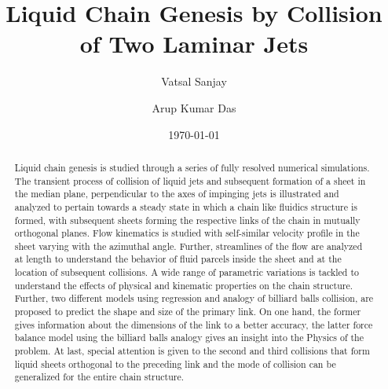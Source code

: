 \documentclass[%
aip,
sd,%
amsmath,amssymb,
preprint,%
author-year,%
]{revtex4-1}
\begin{document}
\newcommand{\MarkerCircleRed}{\raisebox{0.5pt}{\tikz{\node[draw,scale=0.4,circle,fill=red!100!red](){};}}}
\newcommand{\MarkerSquareRed}{\raisebox{0.5pt}{\tikz{\node[draw,scale=0.4,regular polygon, regular polygon sides=4,fill=black!20!red](){};}}}
\newcommand{\MarkerDiamondBlack}{\raisebox{0pt}{\tikz{\node[draw,scale=0.4,diamond,fill=black!100!](){};}}}


\title{Liquid Chain Genesis by Collision of Two Laminar Jets}
\author{Vatsal Sanjay}
\author{Arup Kumar Das}
\date{\today}

\begin{abstract}
Liquid chain genesis is studied through a series of fully resolved numerical simulations. The transient process of collision of liquid jets and subsequent formation of a sheet in the median plane, perpendicular to the axes of impinging jets is illustrated and analyzed to pertain towards a steady state in which a chain like fluidics structure is formed, with subsequent sheets forming the respective links of the chain in mutually orthogonal planes. Flow kinematics is studied with self-similar velocity profile in the sheet varying with the azimuthal angle. Further, streamlines of the flow are analyzed at length to understand the behavior of fluid parcels inside the sheet and at the location of subsequent collisions. A wide range of parametric variations is tackled to understand the effects of physical and kinematic properties on the chain structure. Further, two different models using regression and analogy of billiard balls collision, are proposed to predict the shape and size of the primary link. On one hand, the former gives information about the dimensions of the link to a better accuracy, the latter force balance model using the billiard balls analogy gives an insight into the Physics of the problem. At last, special attention is given to the second and third collisions that form liquid sheets orthogonal to the preceding link and the mode of collision can be generalized for the entire chain structure.     
\end{abstract}
\maketitle
\end{document}
